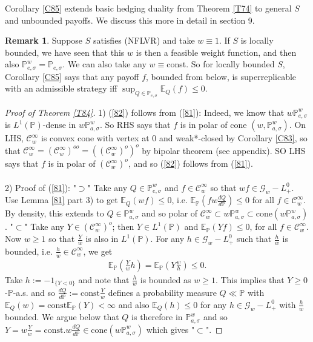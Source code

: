 \documentclass[12pt,a4paper, twoside]{article}
\theoremstyle{definition}
\newtheorem{rem}{Remark}[section]
\newcommand{\EE}{\mathbb{E}} %
\newcommand{\PP}{\mathbb{P}} %
\begin{document}
Corollary \ref{C85} extends basic hedging duality from Theorem \ref{T74} to general $S$ and unbounded payoffs. We discuss this more in detail in section 9. 
\begin{rem} Suppose $S$ satisfies (NFLVR) and take $w \equiv 1$. If $S$ is locally bounded,  we have seen that this $w$ is then a feasible weight function, and then also $\PP_{e, \sigma}^w = \PP_{e, \sigma}$. We can also take any $w \equiv$const. So for locally bounded $S$, Corollary \ref{C85} says that any payoff $f$, bounded from below,  is superreplicable with an admissible strategy iff $\sup_{Q \in \PP_{e, \sigma}} \EE_Q(f) \leq 0$. 
\end{rem}
\begin{proof}[Proof of Theorem \ref{T84}] 1) (\ref{82}) follows from (\ref{81}): Indeed, we know that $w \PP_{e, \sigma}^w$ is $L^1(\PP)$-dense in $w\PP_{a, \sigma}^w$. So RHS says that $f$ is in polar of cone $(w, \PP_{a, \sigma}^w)$. On LHS, $\mathcal{C}_w^\infty$ is convex cone with vertex at $0$ and weak*-closed by Corollary \ref{C83}, so that $\mathcal{C}_w^\infty = ( \mathcal{C}_w^\infty)^{oo} = ( ( \mathcal{C}_w^\infty)^o)^o$ by bipolar theorem (see appendix). SO LHS says that $f$ is in polar of $( \mathcal{C}_w^\infty)^o$, and so (\ref{82}) follows from (\ref{81}). 
\\
\\
2) Proof of (\ref{81}): "$\supset$" Take any $Q \in \mathbb{P}_{e, \sigma}^w$ and $f \in \mathcal{C}_w^\infty$ so that $w f \in \mathcal{G}_w-L_+^0$. Use Lemma \ref{81} part 3) to get $\EE_Q(wf) \leq 0$, i.e. $\EE_\PP(fw \frac{dQ}{d \PP}) \leq 0 $ for all $f \in \mathcal{C}_w^\infty$. By density, this extends to $Q \in \PP_{a, \sigma}^w$ and so polar of $\mathcal{C}_w^\infty \subset w \PP_{a, \sigma}^w \subset \text{cone}(w \PP_{a, \sigma}^w)$. 
\newpage
 "$\subset$" Take any $Y \in ( \mathcal{C}_w^\infty)^o$; then $Y \in L^1 ( \PP)$ and $\EE_\PP(Yf) \leq 0$, for all $f \in \mathcal{C}_w^\infty$. Now $w \geq 1$ so that $\frac{Y}{w}$ is also in $L^1( \PP)$. For any $h \in \mathcal{G}_w-L_+^0$ such that $\frac{h}{w}$ is bounded, i.e. $\frac{h}{w} \in \mathcal{C}_w^\infty$, we get 
\begin{align*}
\EE_\PP\left( \frac{Y}{w}h \right) = \EE_\PP  \left( Y\frac{w}{h} \right) \leq 0. 
\end{align*}
Take $h := -1_{\{ Y < 0\}}$ and note that $\frac{h}{w}$ is bounded as $w \geq 1$. This implies that $Y \geq 0$-$\PP$-a.s. and so $\frac{dQ}{d\PP}:= \text{const} \frac{Y}{w}$ defines a probability measure $Q \ll \PP$ with $\EE_Q(w) = \text{const} \EE_\PP(Y) < \infty$ and also $\EE_Q(h) \leq 0$ for any $h \in \mathcal{G}_w -L_+^0$ with $\frac{h}{w}$ bounded. We argue below that $Q$ is therefore in $\PP_{a,\sigma}^w$ and so $Y= w \frac{Y}{w}= \text{const.}w \frac{dQ}{d\PP} \in \text{cone}(w \PP_{a, \sigma}^w)$ which gives "$\subset$". 

\end{proof}
\end{document}
